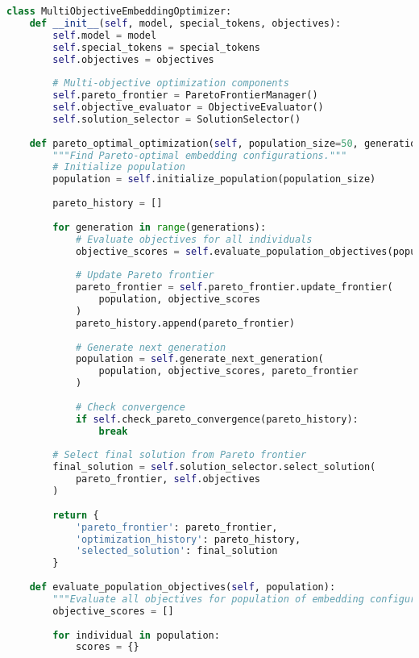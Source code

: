 \begin{lstlisting}[language=Python, caption=Multi-objective embedding optimization]
class MultiObjectiveEmbeddingOptimizer:
    def __init__(self, model, special_tokens, objectives):
        self.model = model
        self.special_tokens = special_tokens
        self.objectives = objectives
        
        # Multi-objective optimization components
        self.pareto_frontier = ParetoFrontierManager()
        self.objective_evaluator = ObjectiveEvaluator()
        self.solution_selector = SolutionSelector()
    
    def pareto_optimal_optimization(self, population_size=50, generations=100):
        """Find Pareto-optimal embedding configurations."""
        # Initialize population
        population = self.initialize_population(population_size)
        
        pareto_history = []
        
        for generation in range(generations):
            # Evaluate objectives for all individuals
            objective_scores = self.evaluate_population_objectives(population)
            
            # Update Pareto frontier
            pareto_frontier = self.pareto_frontier.update_frontier(
                population, objective_scores
            )
            pareto_history.append(pareto_frontier)
            
            # Generate next generation
            population = self.generate_next_generation(
                population, objective_scores, pareto_frontier
            )
            
            # Check convergence
            if self.check_pareto_convergence(pareto_history):
                break
        
        # Select final solution from Pareto frontier
        final_solution = self.solution_selector.select_solution(
            pareto_frontier, self.objectives
        )
        
        return {
            'pareto_frontier': pareto_frontier,
            'optimization_history': pareto_history,
            'selected_solution': final_solution
        }
    
    def evaluate_population_objectives(self, population):
        """Evaluate all objectives for population of embedding configurations."""
        objective_scores = []
        
        for individual in population:
            scores = {}
            

\end{lstlisting}
